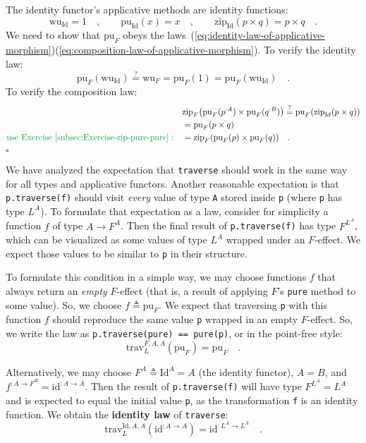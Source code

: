 The identity functor\textsf{'}s applicative methods are identity functions:
\[
\text{wu}_{\text{Id}}=1\quad,\quad\quad\text{pu}_{\text{Id}}(x)=x\quad,\quad\quad\text{zip}_{\text{Id}}(p\times q)=p\times q\quad.
\]
We need to show that $\text{pu}_{F}$ obeys the laws~(\ref{eq:identity-law-of-applicative-morphism})\textendash (\ref{eq:composition-law-of-applicative-morphism}).
To verify the identity law:
\[
\text{pu}_{F}(\text{wu}_{\text{Id}})\overset{?}{=}\text{wu}_{F}=\text{pu}_{F}(1)=\text{pu}_{F}(\text{wu}_{\text{Id}})\quad.
\]
To verify the composition law:
\begin{align*}
 & \text{zip}_{F}\big(\text{pu}_{F}(p^{:A})\times\text{pu}_{F}(q^{:B})\big)\overset{?}{=}\text{pu}_{F}(\text{zip}_{\text{Id}}(p\times q))\\
 & =\text{pu}_{F}(p\times q)\\
{\color{greenunder}\text{use Exercise~\ref{subsec:Exercise-zip-pure-pure}}:}\quad & =\text{zip}_{F}(\text{pu}_{F}(p)\times\text{pu}_{F}(q))\quad.
\end{align*}
$\square$

We have analyzed the expectation that \lstinline!traverse! should
work in the same way for all types and applicative functors. Another
reasonable expectation is that \lstinline!p.traverse(f)! should visit
\emph{every} value of type \lstinline!A! stored inside \lstinline!p!
(where \lstinline!p! has type $L^{A}$). To formulate that expectation
as a law, consider for simplicity a function $f$ of type $A\rightarrow F^{A}$.
Then the final result of \lstinline!p.traverse(f)! has type $F^{L^{A}}$,
which can be visualized as some values of type $L^{A}$ wrapped under
an $F$-effect. We expect those values to be similar to \lstinline!p!
in their structure.

To formulate this condition in a simple way, we may choose functions
$f$ that always return an \emph{empty} $F$-effect (that is, a result
of applying $F$\textsf{'}s \lstinline!pure! method to some value). So, we
choose $f\triangleq\text{pu}_{F}$. We expect that traversing \lstinline!p!
with this function $f$ should reproduce the same value \lstinline!p!
wrapped in an empty $F$-effect. So, we write the law as \lstinline!p.traverse(pure) == pure(p)!,
or in the point-free style:
\begin{equation}
\text{trav}_{L}^{F,A,A}(\text{pu}_{F})=\text{pu}_{F}\quad.\label{eq:traverse-identity-law-with-pure}
\end{equation}

Alternatively, we may choose $F^{A}\triangleq\text{Id}^{A}=A$ (the
identity functor), $A=B$, and $f^{:A\rightarrow F^{B}}=\text{id}^{:A\rightarrow A}$.
Then the result of \lstinline!p.traverse(f)! will have type $F^{L^{A}}=L^{A}$
and is expected to equal the initial value \lstinline!p!, as the
transformation \lstinline!f! is an identity function. We obtain the
\textbf{identity law}
of \lstinline!traverse!:
\begin{equation}
\text{trav}_{L}^{\text{Id},A,A}(\text{id}^{:A\rightarrow A})=\text{id}^{:L^{A}\rightarrow L^{A}}\quad.\label{eq:traverse-identity-law}
\end{equation}

